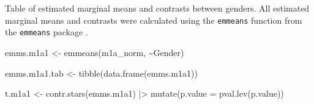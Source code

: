 \documentclass[
  bookmarksnumbered]{article}
\newenvironment{Shaded}{\begin{snugshade}}{\end{snugshade}}
\newcommand{\AttributeTok}[1]{\textcolor[rgb]{0.80,0.80,0.80}{#1}}
\newcommand{\FunctionTok}[1]{\textcolor[rgb]{0.94,0.94,0.56}{#1}}
\newcommand{\NormalTok}[1]{\textcolor[rgb]{0.80,0.80,0.80}{#1}}
\newcommand{\OtherTok}[1]{\textcolor[rgb]{0.94,0.94,0.56}{#1}}
\newcommand{\SpecialCharTok}[1]{\textcolor[rgb]{0.86,0.64,0.64}{#1}}
\begin{document}
Table of estimated marginal means and contrasts between genders. All estimated marginal means and contrasts were calculated using the \texttt{emmeans} function from the \texttt{emmeans} package \autocite{emmeanscit}.

\begin{Shaded}
\begin{Highlighting}[]
\NormalTok{emms.m1a1 }\OtherTok{\textless{}{-}} \FunctionTok{emmeans}\NormalTok{(m1a\_norm, }\SpecialCharTok{\textasciitilde{}}\NormalTok{Gender)}

\NormalTok{emms.m1a1.tab }\OtherTok{\textless{}{-}} \FunctionTok{tibble}\NormalTok{(}\FunctionTok{data.frame}\NormalTok{(emms.m1a1))}

\NormalTok{t.m1a1 }\OtherTok{\textless{}{-}} \FunctionTok{contr.stars}\NormalTok{(emms.m1a1) }\SpecialCharTok{|\textgreater{}}
  \FunctionTok{mutate}\NormalTok{(}\AttributeTok{p.value =} \FunctionTok{pval.lev}\NormalTok{(p.value))}


\end{Highlighting}
\end{Shaded}
\end{document}
